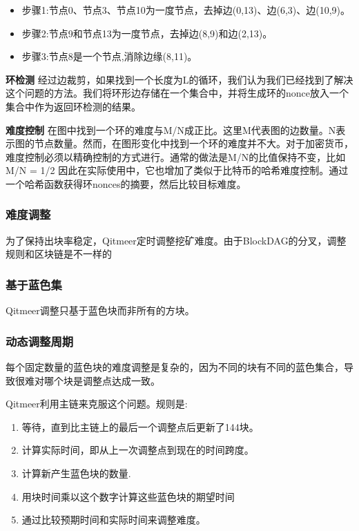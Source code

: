 \documentclass[a4paper,11pt]{article}
\begin{document}
\begin{itemize}
	\item 步骤1:节点0、节点3、节点10为一度节点，去掉边(0,13)、边(6,3)、边(10,9)。
	\item 步骤2:节点9和节点13为一度节点，去掉边(8,9)和边(2,13)。
	\item 步骤3:节点8是一个节点,消除边缘(8,11)。
\end{itemize}


\textbf{环检测}
经过边裁剪，如果找到一个长度为L的循环，我们认为我们已经找到了解决这个问题的方法。我们将环形边存储在一个集合中，并将生成环的nonce放入一个集合中作为返回环检测的结果。


\textbf{难度控制}
在图中找到一个环的难度与M/N成正比。这里M代表图的边数量。N表示图的节点数量。然而，在图形变化中找到一个环的难度并不大。对于加密货币，难度控制必须以精确控制的方式进行。通常的做法是M/N的比值保持不变，比如M/N = 1/2
因此在实际使用中，它也增加了类似于比特币的哈希难度控制。通过一个哈希函数获得环nonces的摘要，然后比较目标难度。

\subsubsection{难度调整}
为了保持出块率稳定，Qitmeer定时调整挖矿难度。由于BlockDAG的分叉，调整规则和区块链是不一样的

\subsubsection*{基于蓝色集}
Qitmeer调整只基于蓝色块而非所有的方块。

\subsubsection*{动态调整周期}
每个固定数量的蓝色块的难度调整是复杂的，因为不同的块有不同的蓝色集合，导致很难对哪个块是调整点达成一致。

Qitmeer利用主链来克服这个问题。规则是:

\begin{enumerate}
	\item  等待，直到比主链上的最后一个调整点后更新了144块。
    \item  计算实际时间，即从上一次调整点到现在的时间跨度。
    \item  计算新产生蓝色块的数量.
    \item  用块时间乘以这个数字计算这些蓝色块的期望时间
    \item  通过比较预期时间和实际时间来调整难度。
\end{enumerate}
\end{document}
